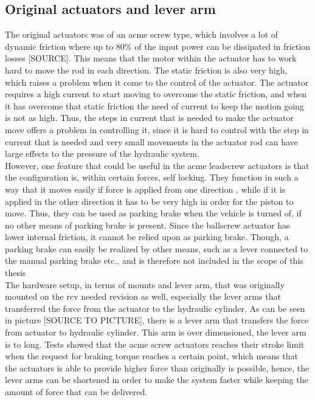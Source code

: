 \documentclass[a4paper,11pt]{kth-mag}
\begin{document}
\subsection{Original actuators and lever arm}
The original actuators was of an acme screw type, which involves a lot of dynamic friction where up to 80\% of the input power can be dissipated in friction losses [SOURCE]. This means that the motor within the actuator has to work hard to move the rod in each direction. The static friction is also very high, which raises a problem when it come to the control of the actuator. The actuator requires a high current to start moving to overcome the static friction, and when it has overcome that static friction the need of current to keep the motion going is not as high. Thus, the steps in current that is needed to make the actuator move offers a problem in controlling it, since it is hard to control with the step in current that is needed and very small movements in the actuator rod can have large effects to the pressure of the hydraulic system. \\

However, one feature that could be useful in the acme leadscrew actuators is that the configuration is, within certain forces, self locking. They function in such a way that it moves easily if force is applied from one direction , while if it is applied in the other direction it has to be very high in order for the piston to move. Thus, they can be used as parking brake when the vehicle is turned of, if no other means of parking brake is present. Since the ballscrew actuator has lower internal friction, it cannot be relied upon as parking brake. Though, a parking brake can easily be realized by other means, such as a lever  connected to the manual parking brake etc., and is therefore not included in the scope of this thesis\\

The hardware setup, in terms of mounts and lever arm, that was originally mounted on the \gls{rcv} needed revision as well, especially the lever arms that transferred the force from the actuator to the hydraulic cylinder. As can be seen in picture [SOURCE TO PICTURE], there is a lever arm that transfers the force from actuator to hydraulic cylinder. This arm is over dimensioned, the lever arm is to long. Tests showed that the acme screw actuators reaches their stroke limit when the request for braking torque reaches a certain point, which means that the actuators is able to provide higher force than  originally is possible, hence, the lever arms can be shortened in order to make the system faster while keeping the amount of force that can be delivered. 
\end{document}
